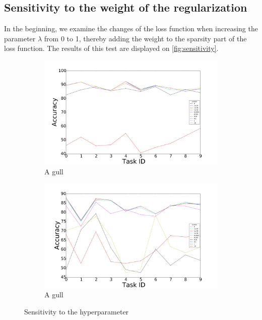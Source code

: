\documentclass{llncs}
\begin{document}
\subsection{Sensitivity to the weight of the regularization}

In the beginning, we examine the changes of the loss function when increasing the parameter $\lambda$ from 0 to 1, thereby adding the weight to the sparsity part of the loss function. The results of this test are displayed on \autoref{fig:sensitivity}.

\begin{figure}[!htb]
    \centering
    \begin{subfigure}[b]{0.45\textwidth}
        \includegraphics[width=\textwidth]{figures/accuracy_lambda}
        \caption{A gull}
    \end{subfigure}
    \begin{subfigure}[b]{0.45\textwidth}
        \includegraphics[width=\textwidth]{figures/accuracy_lambda_mlp}
        \caption{A gull}
    \end{subfigure} 
  \caption{Sensitivity to the hyperparameter}
  \label{fig:sensitivity}
\end{figure}
\end{document}
